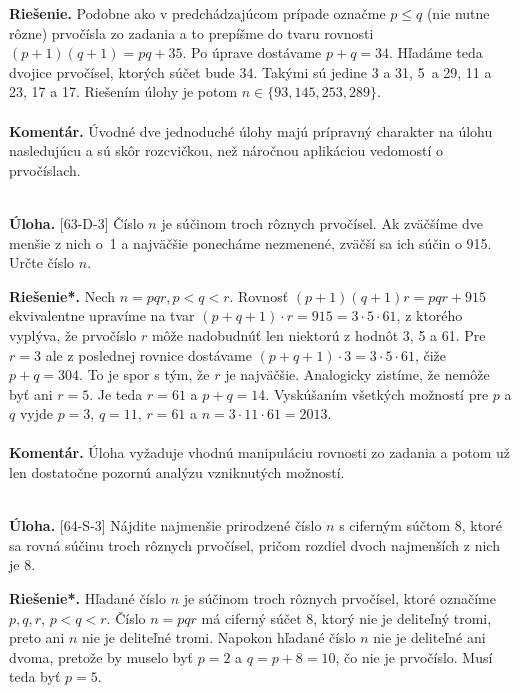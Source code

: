 \documentclass[11pt,a4paper,oneside,final]{book}
\newcommand{\kom}{\textbf{Komentár.} }
\newcommand{\ul}{\textbf{Úloha.} }
\newcommand{\rie}{\textbf{Riešenie.} }
\newcommand{\rieh}{\textbf{Riešenie*.} }
\begin{document}
\rie Podobne ako v predchádzajúcom prípade označme $p\leq q$ (nie nutne rôzne) prvočísla zo zadania a to prepíšme do tvaru rovnosti $(p+1)(q+1)=pq+35$. Po úprave dostávame $p+q=34$. Hľadáme teda dvojice prvočísel, ktorých súčet bude 34. Takými sú jedine 3 a 31, 5~a 29, 11 a 23, 17 a 17. Riešením úlohy je potom $n \in \{93, 145, 253, 289\}$.\\
\\
\kom Úvodné dve jednoduché úlohy majú prípravný charakter na úlohu nasledujúcu a sú skôr rozcvičkou, než náročnou aplikáciou vedomostí o prvočíslach.\\
\\
\begin{tcolorbox}[breakable,notitle,boxrule=0pt,colback=light-gray,colframe=light-gray]\ul [63-D-3]
Číslo $n$ je súčinom troch rôznych prvočísel. Ak zväčšíme dve menšie z nich o~1 a najväčšie ponecháme nezmenené, zväčší sa ich súčin o 915. Určte číslo $n$.

\end{tcolorbox}

\rieh Nech $n = pqr, p < q < r$. Rovnosť $(p + 1)(q + 1)r = pqr + 915$ ekvivalentne upravíme na tvar $(p + q + 1) \cdot r = 915 = 3 \cdot 5 \cdot 61$, z ktorého vyplýva, že prvočíslo $r$ môže nadobudnúť len niektorú z hodnôt 3, 5 a 61. Pre $r = 3$ ale z poslednej rovnice dostávame $(p + q + 1) \cdot 3 = 3 \cdot 5 \cdot 61$, čiže $p + q = 304$. To je spor s tým, že $r$ je najväčšie. Analogicky zistíme, že nemôže byť ani $r = 5$. Je teda $r = 61$ a $p + q = 14$. Vyskúšaním všetkých možností pre $p$ a $q$ vyjde $p = 3$, $q = 11$, $r = 61$ a $n = 3 \cdot 11 \cdot 61 = 2 013$.\\
\\
\kom Úloha vyžaduje vhodnú manipuláciu rovnosti zo zadania a potom už len dostatočne pozornú analýzu vzniknutých možností.\\
\\
\begin{tcolorbox}[breakable,notitle,boxrule=0pt,colback=light-gray,colframe=light-gray]\ul [64-S-3]
Nájdite najmenšie prirodzené číslo $n$ s ciferným súčtom 8, ktoré sa rovná súčinu troch rôznych prvočísel, pričom rozdiel dvoch najmenších z nich je 8.

\end{tcolorbox}

\rieh Hľadané číslo $n$ je súčinom troch rôznych prvočísel, ktoré označíme $p, q, r$, $p < q < r$. Číslo $n = pqr$ má ciferný súčet 8, ktorý nie je deliteľný tromi, preto ani $n$ nie je deliteľné tromi. Napokon hľadané číslo $n$ nie je deliteľné ani dvoma, pretože by muselo byť $p = 2$ a $q = p + 8 = 10$, čo nie je prvočíslo. Musí teda byť $p = 5$.
\end{document}

